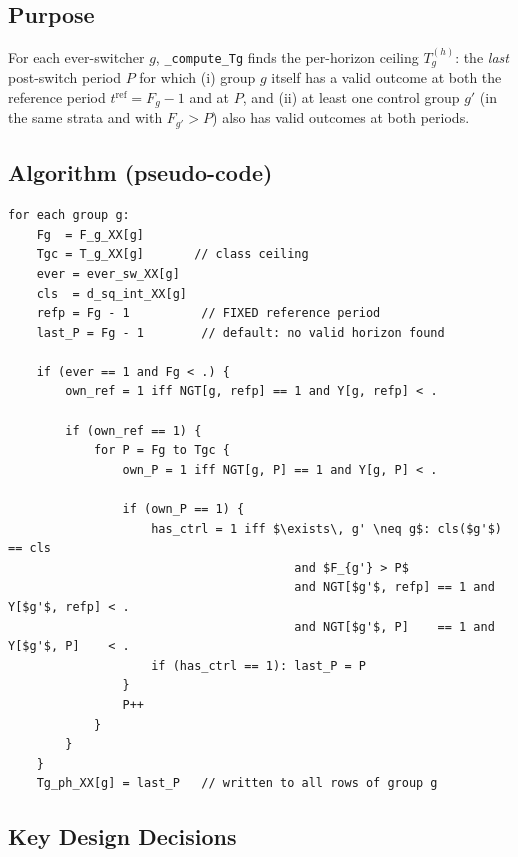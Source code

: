 \documentclass[11pt]{article}
\begin{document}
\subsection{Purpose}

For each ever-switcher $g$, \texttt{\_compute\_Tg} finds the per-horizon
ceiling $T_g^{(h)}$: the \emph{last} post-switch period $P$ for which (i)
group $g$ itself has a valid outcome at both the reference period $t^{\text{ref}}
= F_g - 1$ and at $P$, and (ii) at least one control group $g'$ (in the same
strata and with $F_{g'} > P$) also has valid outcomes at both periods.

\subsection{Algorithm (pseudo-code)}

\begin{lstlisting}[mathescape=true, language={}]
for each group g:
    Fg  = F_g_XX[g]
    Tgc = T_g_XX[g]       // class ceiling
    ever = ever_sw_XX[g]
    cls  = d_sq_int_XX[g]
    refp = Fg - 1          // FIXED reference period
    last_P = Fg - 1        // default: no valid horizon found

    if (ever == 1 and Fg < .) {
        own_ref = 1 iff NGT[g, refp] == 1 and Y[g, refp] < .

        if (own_ref == 1) {
            for P = Fg to Tgc {
                own_P = 1 iff NGT[g, P] == 1 and Y[g, P] < .

                if (own_P == 1) {
                    has_ctrl = 1 iff $\exists\, g' \neq g$: cls($g'$) == cls
                                        and $F_{g'} > P$
                                        and NGT[$g'$, refp] == 1 and Y[$g'$, refp] < .
                                        and NGT[$g'$, P]    == 1 and Y[$g'$, P]    < .
                    if (has_ctrl == 1): last_P = P
                }
                P++
            }
        }
    }
    Tg_ph_XX[g] = last_P   // written to all rows of group g
\end{lstlisting}

\subsection{Key Design Decisions}
\end{document}
